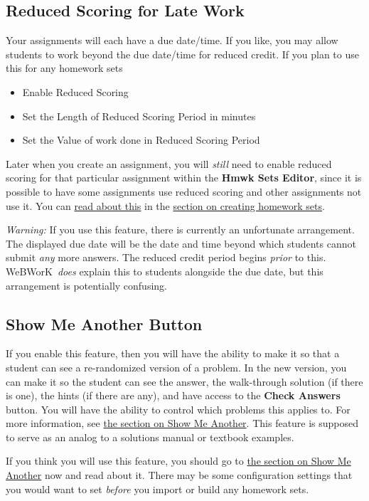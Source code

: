 \documentclass[12pt]{article}
\newcommand{\menu}[1]{\textbf{#1}}
\newcommand{\WW}{WeBWorK}
\newcommand{\HSE}{\menu{Hmwk Sets Editor}}
\begin{document}
\subsection{Reduced Scoring for Late Work}

Your assignments will each have a due date/time.
If you like, you may allow students to work beyond the due date/time for reduced credit.
If you plan to use this for any homework sets \begin{itemize}
	\item Enable Reduced Scoring
	\item Set the Length of Reduced Scoring Period in minutes
	\item Set the Value of work done in Reduced Scoring Period \end{itemize} Later when you create an assignment, you will \emph{still} need to enable reduced scoring for that particular assignment within the \HSE, since it is possible to have some assignments use reduced scoring and other assignments not use it.
You can \hyperref[reducedcredit]{read about this} in the \hyperref[makeset]{section on creating homework sets}.

\emph{Warning:}
If you use this feature, there is currently an unfortunate arrangement.
The displayed due date will be the date and time beyond which students cannot submit \emph{any} more answers.
The reduced credit period begins \emph{prior} to this.
\WW\ \emph{does} explain this to students alongside the due date, but this arrangement is potentially confusing.

\subsection{Show Me Another Button}

If you enable this feature, then you will have the ability to make it so that a student can see a re-randomized version of a problem.
In the new version, you can make it so the student can see the answer, the walk-through solution (if there is one), the hints (if there are any), and have access to the \menu{Check Answers} button.
You will have the ability to control which problems this applies to.
For more information, see \hyperref[SMA]{the section on Show Me Another}.
This feature is supposed to serve as an analog to a solutions manual or textbook examples.

If you think you will use this feature, you should go to  \hyperref[SMA]{the section on Show Me Another} now and read about it.
There may be some configuration settings that you would want to set \emph{before} you import or build any homework sets.
\end{document}
